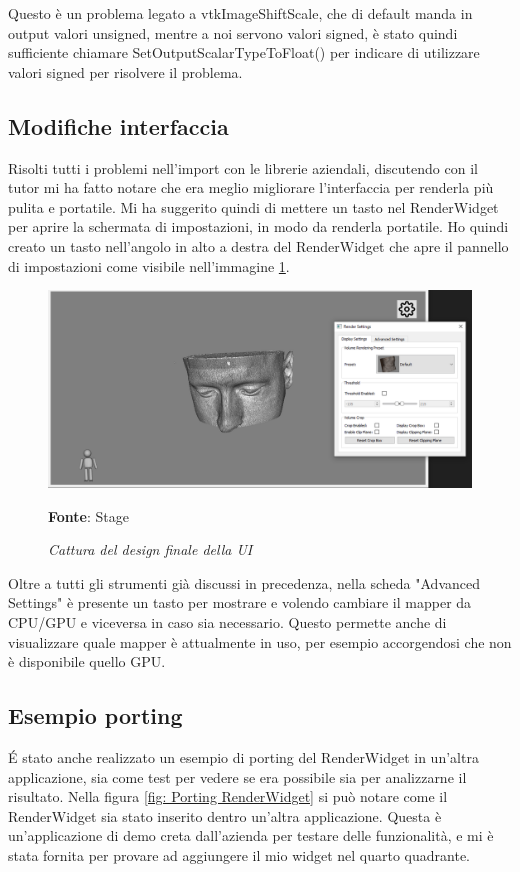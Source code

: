 Questo è un problema legato a vtkImageShiftScale, che di default manda in output valori unsigned, mentre a noi servono valori signed, è stato quindi sufficiente chiamare SetOutputScalarTypeToFloat() per indicare di utilizzare valori signed per risolvere il problema.

\subsection{Modifiche interfaccia}
Risolti tutti i problemi nell'import con le librerie aziendali, discutendo con il tutor mi ha fatto notare che era meglio migliorare l'interfaccia per renderla più pulita e portatile. Mi ha suggerito quindi di mettere un tasto nel RenderWidget per aprire la schermata di impostazioni, in modo da renderla portatile. Ho quindi creato un tasto nell'angolo in alto a destra del RenderWidget che apre il pannello di impostazioni come visibile nell'immagine \ref{fig: Final UI}.

\begin{figure}[h]
    \centering
    \includegraphics[width=1\textwidth]{immagini/svolgimento/finalnewui.png}
    \caption{\textit{Cattura del design finale della UI}}
    \textbf{Fonte}: Stage
    \label{fig: Final UI}
\end{figure}

Oltre a tutti gli strumenti già discussi in precedenza, nella scheda "Advanced Settings" è presente un tasto per mostrare e volendo cambiare il mapper da CPU/GPU e viceversa in caso sia necessario. Questo permette anche di visualizzare quale mapper è attualmente in uso, per esempio accorgendosi che non è disponibile quello GPU.

\subsection{Esempio porting}
\'E stato anche realizzato un esempio di porting del RenderWidget in un'altra applicazione, sia come test per vedere se era possibile sia per analizzarne il risultato. Nella figura \ref{fig: Porting RenderWidget} si può notare come il RenderWidget sia stato inserito dentro un'altra applicazione. Questa è un'applicazione di demo creta dall'azienda per testare delle funzionalità, e mi è stata fornita per provare ad aggiungere il mio widget nel quarto quadrante.

